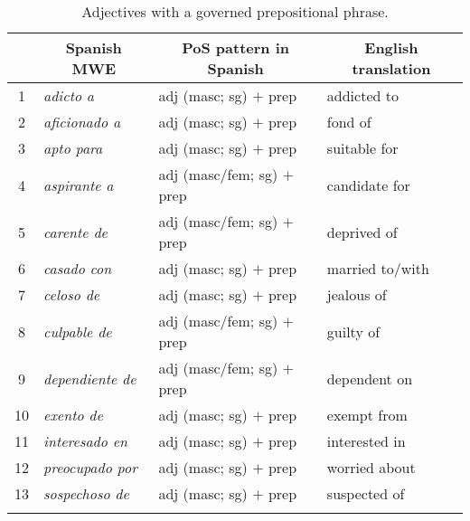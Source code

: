 \documentclass[output=paper]{langsci/langscibook}
\begin{document}
\begin{table}[H]
\centering
\caption{Adjectives with a governed prepositional phrase.}
\label{tab:adjPPs}
\begin{tabular}{c|lll}
\lsptoprule
\textbf{} & \multicolumn{1}{c}{\textbf{Spanish MWE}} & \multicolumn{1}{c}{\textbf{PoS pattern in Spanish}} & \multicolumn{1}{c}{\textbf{English translation}} \\ %
\midrule
1 & \textit{adicto a} & adj (masc; sg) $+$ prep & addicted to \\
2 & \textit{aficionado a} & adj (masc; sg) $+$ prep & fond of \\
3 & \textit{apto para} & adj (masc; sg) $+$ prep & suitable for \\
4 & \textit{aspirante a} & adj (masc/fem; sg) $+$ prep & candidate for \\
5 & \textit{carente de} & adj (masc/fem; sg) $+$ prep & deprived of \\
6 & \textit{casado con} & adj (masc; sg) $+$ prep & married to/with \\
7 & \textit{celoso de} & adj (masc; sg) $+$ prep & jealous of \\
8 & \textit{culpable de} & adj (masc/fem; sg) $+$ prep & guilty of \\
9 & \textit{dependiente de} & adj (masc/fem; sg) $+$ prep & dependent on \\
10 & \textit{exento de} & adj (masc; sg) $+$ prep & exempt from \\
11 & \textit{interesado en} & adj (masc; sg) $+$ prep & interested in \\
12 & \textit{preocupado por} & adj (masc; sg) $+$ prep & worried about \\
13 & \textit{sospechoso de} & adj (masc; sg) $+$ prep & suspected of\\
\lspbottomrule
\end{tabular}
\end{table}

\begin{table}[H]
\centering
\caption{Adverbial expression.}
\label{tab:advExps-flexible}
\end{table}
\end{document}
